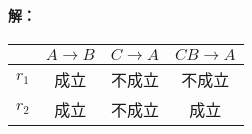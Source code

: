\paragraph{解：}
\begin{table}[H]
	\centering
	\begin{tabular}{|c|c|c|c|}
		\hline
		& $A \to B$ & $C \to A$ & $CB \to A$ \\\hline
		$r_{1}$ & 成立 & 不成立 & 不成立 \\
		$r_{2}$ & 成立 & 不成立 & 成立 \\\hline
	\end{tabular}
\end{table}